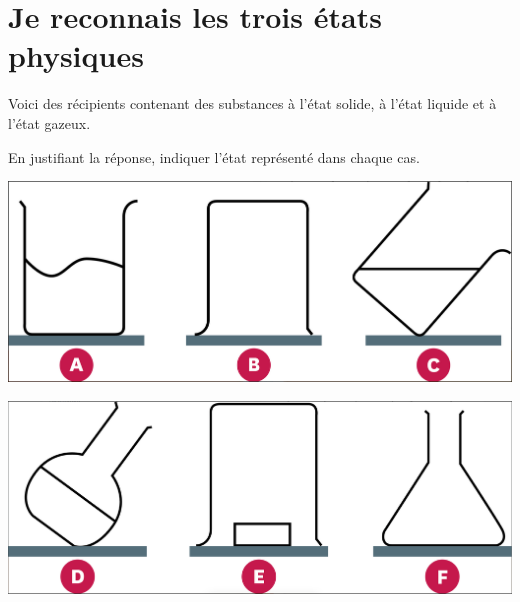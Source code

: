\section{Je reconnais les trois états physiques}

Voici des récipients contenant des substances à l'état solide, à l'état liquide et à l'état gazeux.

\begin{questions}
	\question[] En justifiant la réponse, indiquer l'état représenté dans chaque cas.
	\begin{multicols}{2}
		
			\includegraphics[scale=0.22]{img/reco1}
	
			\includegraphics[scale=0.22]{img/reco2}

	\end{multicols}
\end{questions}